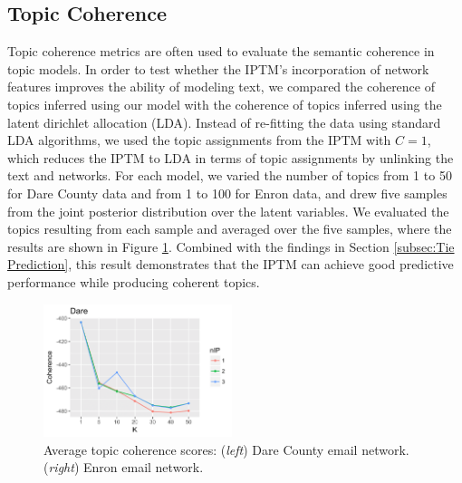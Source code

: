\documentclass{article}
\begin{document}
\subsection{Topic Coherence}\label{subsec:Topic Coherence}
Topic coherence metrics \cite{mimno2011optimizing} are often used to evaluate the semantic coherence in topic models. In order to test whether the IPTM's incorporation of network features improves the ability of modeling text, we compared the coherence of topics inferred using our model with the coherence of topics inferred using the latent dirichlet allocation (LDA). Instead of re-fitting the data using standard LDA algorithms, we used the topic assignments from the IPTM with $C=1$, which reduces the IPTM to LDA in terms of topic assignments by unlinking the text and networks. For each model, we varied the number of topics from 1 to 50 for Dare County data and from 1 to 100 for Enron data, and drew five samples from the joint posterior distribution over the latent variables. We evaluated the topics resulting from each sample and averaged over the five samples, where the results are shown in Figure \ref{fig:topic}. Combined with the findings in Section \ref{subsec:Tie Prediction}, this result demonstrates that the IPTM can achieve good predictive performance while producing coherent topics. 
\begin{figure}[h]
	\centering
	\includegraphics[width = 0.49\textwidth]{plots/Dare_topic-1.png}
	\caption{Average topic coherence scores: (\textit{left}) Dare County email network. (\textit{right}) Enron email network.}
	\label{fig:topic}
\end{figure}
\end{document}
